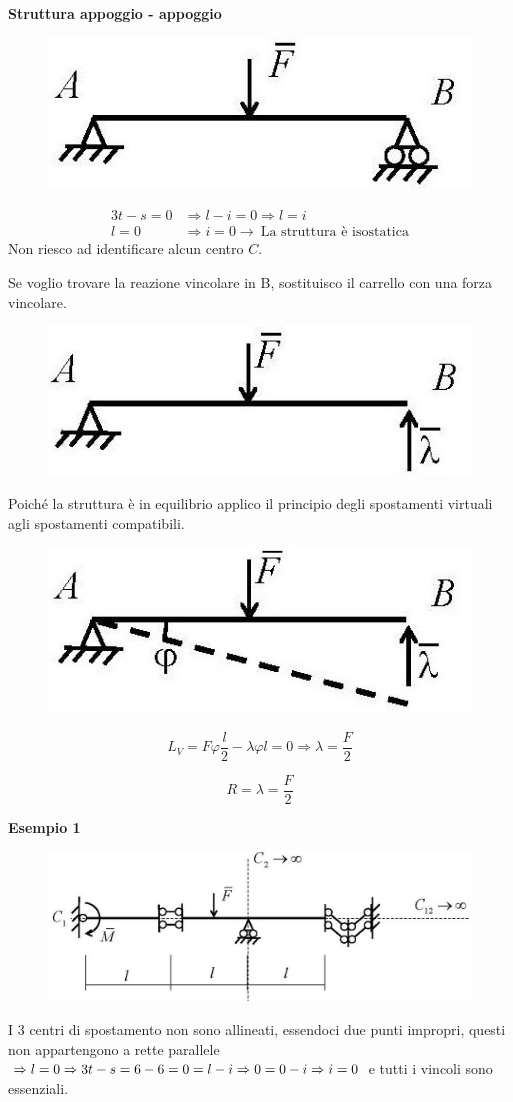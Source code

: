 \documentclass{article}
\begin{document}
\begin{adjustwidth}{2in}{}
\textbf{Struttura appoggio - appoggio}
\begin{figure}[H]
	\centering
	\includegraphics[width=0.25\linewidth]{immagini/1.PARTE4_Pagina_18 (2)}
\end{figure}
\[
\begin{split}
	3t - s = 0 & \Rightarrow l - i = 0 \Rightarrow l = i \\
	l =0 & \Rightarrow i = 0 \rightarrow ~ \text{La struttura è isostatica}
\end{split}
\]
Non riesco ad identificare alcun centro $C$.\newline

 Se voglio trovare la reazione vincolare in B, sostituisco il carrello con una forza vincolare. 
 \begin{figure}[H]
 	\centering
 	\includegraphics[width=0.25\linewidth]{immagini/1.PARTE4_Pagina_18 (3)}
 \end{figure}
 Poiché la struttura è in equilibrio applico il principio degli spostamenti virtuali agli spostamenti compatibili. 
 \begin{figure}[H]
	\centering
	\includegraphics[width=0.25\linewidth]{immagini/1.PARTE4_Pagina_18}
\end{figure}
 \[
 L_V = F\varphi \frac{l}{2} - \lambda \varphi l = 0 \Rightarrow \lambda = \frac{F}{2}
 \] 
 
 \[
 R= \lambda = \frac{F}{2}
 \]
 
 \textbf{Esempio 1}
 \begin{figure}[H]
	\centering
	\includegraphics[width=0.65\linewidth]{immagini/1.PARTE4_Pagina_19 (2)}
\end{figure}
 I 3 centri di spostamento non sono allineati, essendoci due punti impropri, questi non appartengono a rette parallele $\Rightarrow l = 0 \Rightarrow  \newline 3t-s = 6-6 = 0 = l - i \Rightarrow 0 = 0 - i \Rightarrow i = 0$ \newline e tutti i vincoli sono essenziali. \newline 
 

\end{adjustwidth}
\end{document}
